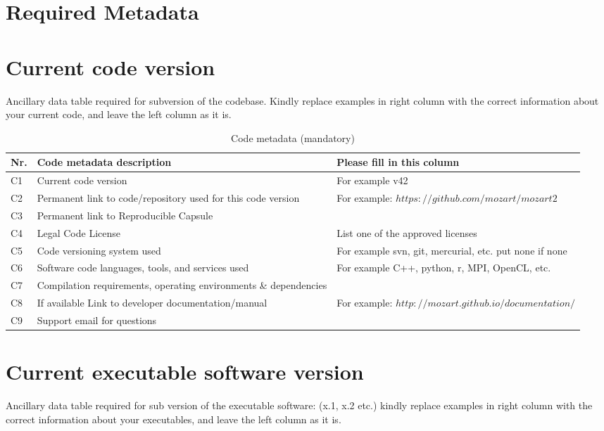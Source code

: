\documentclass[preprint,12pt,letterpaper]{elsarticle}
\begin{document}
\section*{Required Metadata}

\section*{Current code version}

Ancillary data table required for subversion of the codebase. Kindly replace examples in right column with the correct information about your current code, and leave the left column as it is.

\begin{table}[!h]
\begin{tabular}{|l|p{6.5cm}|p{6.5cm}|}
\hline
\textbf{Nr.} & \textbf{Code metadata description} & \textbf{Please fill in this column} \\
\hline
C1 & Current code version & For example v42 \\
\hline
C2 & Permanent link to code/repository used for this code version & For example: $https://github.com/mozart/mozart2$ \\
\hline
C3  & Permanent link to Reproducible Capsule & \\
\hline
C4 & Legal Code License   & List one of the approved licenses \\
\hline
C5 & Code versioning system used & For example svn, git, mercurial, etc. put none if none \\
\hline
C6 & Software code languages, tools, and services used & For example C++, python, r, MPI, OpenCL, etc. \\
\hline
C7 & Compilation requirements, operating environments \& dependencies & \\
\hline
C8 & If available Link to developer documentation/manual & For example: $http://mozart.github.io/documentation/$ \\
\hline
C9 & Support email for questions & \\
\hline
\end{tabular}
\caption{Code metadata (mandatory)}
\end{table}

\section*{Current executable software version}

Ancillary data table required for sub version of the executable software: (x.1, x.2 etc.) kindly replace examples in right column with the correct information about your executables, and leave the left column as it is.
\end{document}

